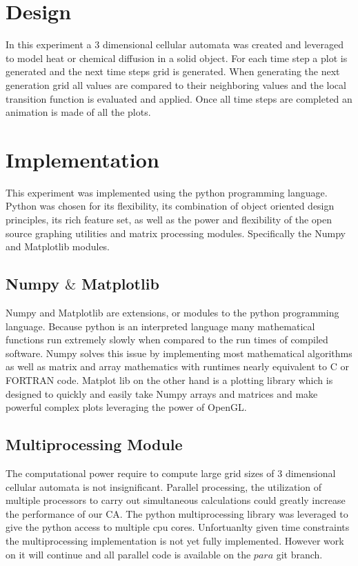 \documentclass[11pt,twocolumn]{article}
\begin{document}
\section{Design}
In this experiment a 3 dimensional cellular automata was created and leveraged to model heat or chemical diffusion in a solid object. 
For each time step a plot is generated and the next time steps grid is generated. When generating the next generation grid all values 
are compared to their neighboring values and the local transition function is evaluated and applied. Once all time steps are completed an animation is made of all the plots.
\section{Implementation} 
This experiment was implemented using the python programming language. 
Python was chosen for its flexibility, its combination of object oriented design principles, its rich feature set, 
as well as the power and flexibility of the open source graphing utilities and matrix processing modules. 
Specifically the Numpy and Matplotlib modules.

\subsection{Numpy $\&$ Matplotlib }
Numpy and Matplotlib are extensions, or modules to the python programming language. Because python is an interpreted language 
many mathematical functions run extremely slowly when compared to the run times of compiled software. 
Numpy solves this issue by implementing most mathematical algorithms as well as matrix and array mathematics with runtimes nearly equivalent to C or FORTRAN code.\cite{mplot} 
Matplot lib on the other hand is a plotting library which is designed to quickly and easily take Numpy arrays and matrices and make powerful complex plots leveraging the power of OpenGL.\cite{numpy} 

\subsection{Multiprocessing Module}
The computational power require to compute large grid sizes of 3 dimensional cellular automata is not insignificant. Parallel processing, the utilization of multiple processors to carry out simultaneous calculations could greatly increase the performance of our CA. The python multiprocessing library was leveraged to give the python access to multiple cpu cores. Unfortuanlty given time constraints the multiprocessing implementation is not yet fully implemented. However work on it will continue and all parallel code is available on the $para$ git branch.
\end{document}
